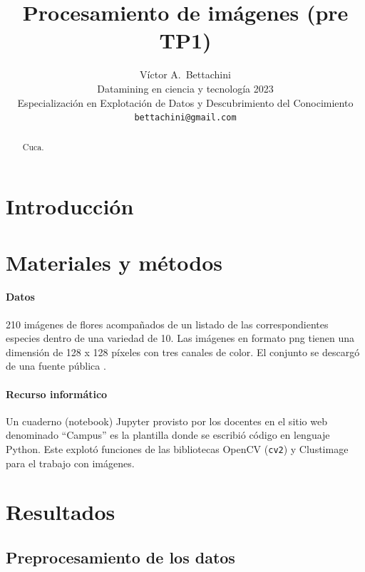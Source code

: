 \documentclass{article}
\title{Procesamiento de imágenes (pre TP1)}
\author{
  Víctor A.~Bettachini\\ %
  Datamining en ciencia y tecnología 2023\\
  Especialización en Explotación de Datos y Descubrimiento del Conocimiento\\
  \texttt{bettachini@gmail.com}
}
\begin{document}
\maketitle


\begin{abstract}
Cuca.
\end{abstract}


\section{Introducción}



\section{Materiales y métodos}

\paragraph{Datos}
210 imágenes de flores acompañados de un listado de las correspondientes especies dentro de una variedad de 10.
Las imágenes en formato png tienen una dimensión de 128 x 128 píxeles con tres canales de color.
El conjunto se descargó de una fuente pública \cite{belitskaya_flower_2020}.


\paragraph{Recurso informático} 
Un cuaderno (notebook) Jupyter provisto por los docentes en el sitio web denominado ``Campus'' \cite{kamienkowski_curso_2023} es la plantilla donde se escribió código en lenguaje Python.
Este explotó funciones de las bibliotecas OpenCV (\verb'cv2') y Clustimage para el trabajo con imágenes.


\section{Resultados}

\subsection{Preprocesamiento de los datos}
\end{document}
